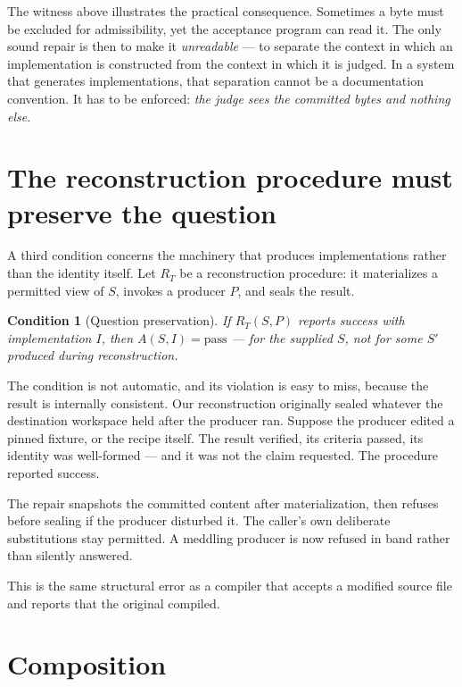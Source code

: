 \documentclass[10pt,twocolumn,letterpaper]{article}
\newtheorem{condition}{Condition}
\begin{document}
The witness above illustrates the practical consequence. Sometimes a byte must be excluded for admissibility, yet the acceptance program can read it. The only sound repair is then to make it \emph{unreadable} --- to separate the context in which an implementation is constructed from the context in which it is judged. In a system that generates implementations, that separation cannot be a documentation convention. It has to be enforced: \emph{the judge sees the committed bytes and nothing else}.

\section{The reconstruction procedure must preserve the question}
\label{sec:preserve}
A third condition concerns the machinery that produces implementations rather than the identity itself. Let $R_T$ be a reconstruction procedure: it materializes a permitted view of $S$, invokes a producer $P$, and seals the result.

\begin{condition}[Question preservation]
If $R_T(S,P)$ reports success with implementation $I$, then $A(S,I)=\mathrm{pass}$ --- for the \emph{supplied} $S$, not for some $S'$ produced during reconstruction.
\end{condition}

\noindent The condition is not automatic, and its violation is easy to miss, because the result is internally consistent. Our reconstruction originally sealed whatever the destination workspace held after the producer ran. Suppose the producer edited a pinned fixture, or the recipe itself. The result verified, its criteria passed, its identity was well-formed --- and it was not the claim requested. The procedure reported success.

The repair snapshots the committed content after materialization, then refuses before sealing if the producer disturbed it. The caller's own deliberate substitutions stay permitted. A meddling producer is now refused in band rather than silently answered.

This is the same structural error as a compiler that accepts a modified source file and reports that the original compiled.

\section{Composition}
\label{sec:compose}
\end{document}
